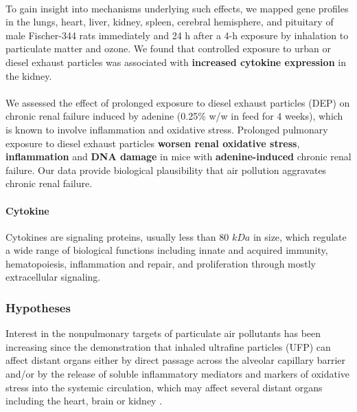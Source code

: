 \documentclass{article}
\begin{document}
\paragraph{\citet{thomson2013mapping}} To gain insight into mechanisms underlying such effects, we mapped gene profiles in the lungs, heart, liver, kidney, spleen, cerebral hemisphere, and pituitary of male Fischer-344 rats immediately and 24 h after a 4-h exposure by inhalation to particulate matter and ozone. We found that controlled exposure to urban or diesel exhaust particles was associated with \textbf{increased cytokine expression} in the kidney.

\paragraph{\citet{nemmar2016prolonged}} We assessed the effect of prolonged exposure to diesel exhaust particles (DEP) on chronic renal failure induced by adenine (0.25\% w/w in feed for 4 weeks), which is known to involve inflammation and oxidative stress. Prolonged pulmonary exposure to diesel exhaust particles \textbf{worsen renal oxidative stress}, \textbf{inflammation} and \textbf{DNA damage} in mice with \textbf{adenine-induced} chronic renal failure. Our data provide biological plausibility that air pollution aggravates chronic renal failure.

\paragraph{Cytokine} Cytokines are signaling proteins, usually less than 80 $kDa$ in size, which regulate a wide range of biological functions including innate and acquired immunity, hematopoiesis, inflammation and repair, and proliferation through mostly extracellular signaling. 

\subsubsection{Hypotheses}

Interest in the nonpulmonary targets of particulate air pollutants has been increasing since the demonstration that inhaled ultrafine particles (UFP) can affect distant organs either by direct passage across the alveolar capillary barrier and/or by the release of soluble inflammatory mediators and markers of oxidative stress into the systemic circulation, which may affect several distant organs including the heart, brain or kidney \citep{nemmar2013recent, nemmar2004possible, oberdorster2005nanotoxicology, peters2006translocation, vermylen2005ambient}. 
\end{document}
